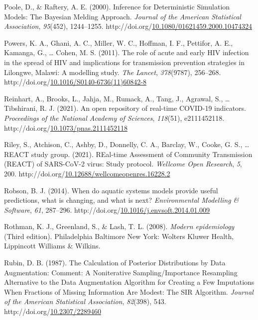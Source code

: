 \documentclass[12pt,twoside]{smiththesis}
\newlength{\cslhangindent}
\newenvironment{CSLReferences}[2] %
 {%
\setlength{\parindent}{0pt}
\ifodd #1 \everypar{\setlength{\hangindent}{\cslhangindent}}\ignorespaces\fi
\ifnum #2 > 0
\setlength{\parskip}{#2\baselineskip}
  \fi
}%
{}
\begin{document}
\begin{CSLReferences}{1}{0}
\leavevmode{}%
Poole, D., \& Raftery, A. E. (2000). Inference for {Deterministic Simulation Models}: {The Bayesian Melding Approach}. \emph{Journal of the American Statistical Association}, \emph{95}(452), 1244--1255. http://doi.org/\href{https://doi.org/10.1080/01621459.2000.10474324}{10.1080/01621459.2000.10474324}

\leavevmode{}%
Powers, K. A., Ghani, A. C., Miller, W. C., Hoffman, I. F., Pettifor, A. E., Kamanga, G., \ldots{} Cohen, M. S. (2011). The role of acute and early {HIV} infection in the spread of {HIV} and implications for transmission prevention strategies in {Lilongwe}, {Malawi}: A modelling study. \emph{The Lancet}, \emph{378}(9787), 256--268. http://doi.org/\href{https://doi.org/10.1016/S0140-6736(11)60842-8}{10.1016/S0140-6736(11)60842-8}

\leavevmode{}%
Reinhart, A., Brooks, L., Jahja, M., Rumack, A., Tang, J., Agrawal, S., \ldots{} Tibshirani, R. J. (2021). An open repository of real-time {COVID-19} indicators. \emph{Proceedings of the National Academy of Sciences}, \emph{118}(51), e2111452118. http://doi.org/\href{https://doi.org/10.1073/pnas.2111452118}{10.1073/pnas.2111452118}

\leavevmode{}%
Riley, S., Atchison, C., Ashby, D., Donnelly, C. A., Barclay, W., Cooke, G. S., \ldots{} REACT study group. (2021). {REal-time Assessment} of {Community Transmission} ({REACT}) of {SARS-CoV-2} virus: {Study} protocol. \emph{Wellcome Open Research}, \emph{5}, 200. http://doi.org/\href{https://doi.org/10.12688/wellcomeopenres.16228.2}{10.12688/wellcomeopenres.16228.2}

\leavevmode{}%
Robson, B. J. (2014). When do aquatic systems models provide useful predictions, what is changing, and what is next? \emph{Environmental Modelling \& Software}, \emph{61}, 287--296. http://doi.org/\href{https://doi.org/10.1016/j.envsoft.2014.01.009}{10.1016/j.envsoft.2014.01.009}

\leavevmode{}%
Rothman, K. J., Greenland, S., \& Lash, T. L. (2008). \emph{Modern epidemiology} (Third edition). {Philadelphia Baltimore New York}: {Wolters Kluwer Health, Lippincott Williams \& Wilkins}.

\leavevmode{}%
Rubin, D. B. (1987). The {Calculation} of {Posterior Distributions} by {Data Augmentation}: {Comment}: {A Noniterative Sampling}/{Importance Resampling Alternative} to the {Data Augmentation Algorithm} for {Creating} a {Few Imputations When Fractions} of {Missing Information Are Modest}: {The SIR Algorithm}. \emph{Journal of the American Statistical Association}, \emph{82}(398), 543. http://doi.org/\href{https://doi.org/10.2307/2289460}{10.2307/2289460}


\end{CSLReferences}
\end{document}
